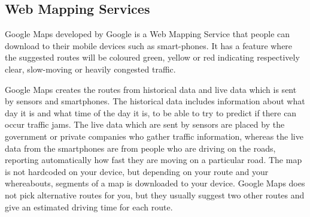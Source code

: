 \subsection*{Web Mapping Services}
%
Google Maps developed by Google is a Web Mapping Service that people can download to their mobile devices such as smart-phones. It has a feature where the suggested routes will be coloured green, yellow or red indicating respectively clear, slow-moving or heavily congested traffic.

Google Maps creates the routes from historical data and live data which is sent by sensors and smartphones\cite{Googleabout}. The historical data includes information about what day it is and what time of the day it is, to be able to try to predict if there can occur traffic jams. The live data which are sent by sensors are placed by the government or private companies who gather traffic information, whereas the live data from the smartphones are from people who are driving on the roads, reporting automatically how fast they are moving on a particular road. The map is not hardcoded on your device, but depending on your route and your whereabouts, segments of a map is downloaded to your device. Google Maps does not pick alternative routes for you, but they usually suggest two other routes and give an estimated driving time for each route\cite{Ncta}.

